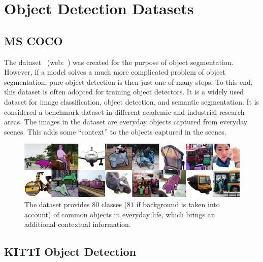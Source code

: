 \section{Object Detection Datasets}
\label{sec:ObjectDetectionDatasets}

\subsection{MS COCO}
\label{ssec:DatasetMSCOCO}

The  dataset~\cite{lin2014mscoco} (web:~\cite{webmscocodataset}) was created for the purpose of object segmentation. However, if a model solves a much more complicated problem of object segmentation, pure object detection is then just one of many steps. To this end, this dataset is often adopted for training object detectors. It is a widely used dataset for image classification, object detection, and semantic segmentation. It is considered a benchmark dataset in different academic and industrial research areas. The images in the dataset are everyday objects captured from everyday scenes. This adds some “context” to the objects captured in the scenes.

\begin{figure}[t]
    \centerline{\includegraphics[width=\linewidth]{figures/datasets/ms_coco_sample.jpeg}}
    \caption[ dataset]{The  dataset provides $80$ classes ($81$ if background is taken into account) of common objects in everyday life, which brings an additional contextual information. }
    \label{fig:DatasetMSCOCO}
\end{figure}

\subsection{KITTI Object Detection}
\label{ssec:DatasetKITTIObjectDetection}

